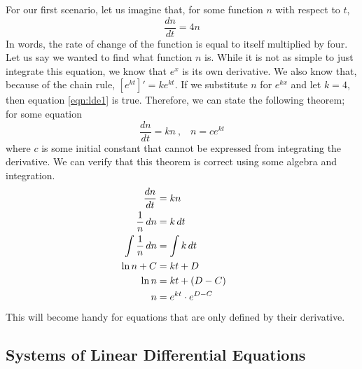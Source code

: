 \documentclass[12pt]{article}
\begin{document}
	For our first scenario, let us imagine that, for some function $n$ with respect to $t$,
	\begin{equation}\label{eqn:lde1}
		\frac{dn}{dt} = 4n
	\end{equation}
	In words, the rate of change of the function is equal to itself multiplied by four. Let us say we wanted to find what function $n$ is.
	While it is not as simple to just integrate this equation, we know that $e^x$ is its own derivative.
	We also know that, because of the chain rule, $[e^{kt}]' = ke^{kt}$.
	If we substitute $n$ for $e^{kx}$ and let $k = 4$, then equation \eqref{eqn:lde1} is true.
	Therefore, we can state the following theorem; for some equation
	\begin{equation}\label{eqn:theory1}
		\frac{dn}{dt} = kn\ \text{,} \quad n = ce^{kt}
	\end{equation}
	where $c$ is some initial constant that cannot be expressed from integrating the derivative.
	We can verify that this theorem is correct using some algebra and integration.
	\begin{align*}
		\frac{dn}{dt} &= kn \\
		\frac{1}{n}\, dn &= k\, dt \\
		\int \frac{1}{n}\, dn &= \int k\, dt \\
		\ln n + C &= kt + D \\
		\ln n &= kt + (D - C) \\
		n &= e^{kt} \cdot e^{D - C} \hspace*{3em}
	\end{align*}
	This will become handy for equations that are only defined by their derivative.
	
	\subsection{Systems of Linear Differential Equations} \label{sec:ode-sys}
	
\end{document}
